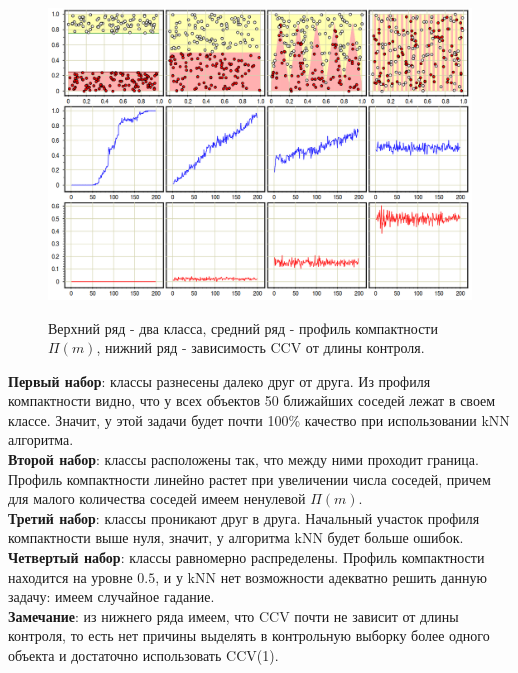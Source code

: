 \begin{figure}[h]
	\centering
	\includegraphics[width=\textwidth]{chapters/metric/images/compact.png}
	\label{fig:compact}
	\caption{
		Верхний ряд - два класса, средний ряд - профиль компактности $\Pi(m)$, нижний ряд - зависимость CCV от длины контроля.
	}
\end{figure}

\noindent
\textbf{Первый набор}: классы разнесены далеко друг от друга. Из профиля компактности видно, что у всех объектов 50 ближайших соседей лежат в своем классе. Значит, у этой задачи будет почти 100\% качество при использовании kNN алгоритма. \\

\noindent
\textbf{Второй набор}: классы расположены так, что между ними проходит граница. Профиль компактности линейно растет при увеличении числа соседей, причем для малого количества соседей имеем ненулевой $\Pi(m)$. \\

\noindent
\textbf{Третий набор}: классы проникают друг в друга. Начальный участок профиля компактности выше нуля, значит, у алгоритма kNN будет больше ошибок. \\

\noindent
\textbf{Четвертый набор}: классы равномерно распределены. Профиль компактности находится на уровне $0.5$, и у kNN нет возможности адекватно решить данную задачу: имеем случайное гадание. \\

\noindent
\textbf{Замечание}: из нижнего ряда имеем, что CCV почти не зависит от длины контроля, то есть нет причины выделять в контрольную выборку более одного объекта и достаточно использовать CCV(1).



